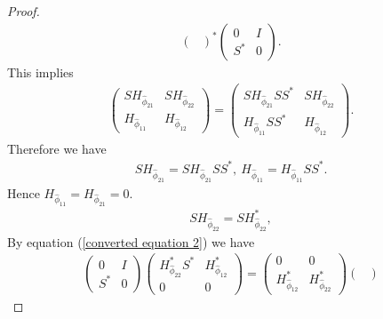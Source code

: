 \documentclass[10pt,a4paper]{amsart}
\begin{document}
\begin{proof}
\begin{align*}
\begin{pmatrix}
                \end{pmatrix}^*
                \begin{pmatrix}
                    0&I\\
                    S^*&0
                \end{pmatrix}.
            \end{align*}
            This implies
            \begin{align*}
               \begin{pmatrix}
                SH_{\hat{\phi}_{21}}&SH_{\hat{\phi}_{22}}\\
                H_{\hat{\phi}_{11}}&H_{\hat{\phi}_{12}}
                \end{pmatrix}=
                \begin{pmatrix}
                SH_{\hat{\phi}_{21}}SS^*&SH_{\hat{\phi}_{22}}\\
                H_{\hat{\phi}_{11}}SS^*&H_{\hat{\phi}_{12}}
            \end{pmatrix}.
            \end{align*}
            Therefore we have
            \begin{align}\label{E1}
                SH_{\hat{\phi}_{21}}=SH_{\hat{\phi}_{21}}SS^*, ~H_{\hat{\phi}_{11}}=H_{\hat{\phi}_{11}}SS^*.
            \end{align}
            Hence $H_{\hat{\phi}_{11}}=H_{\hat{\phi}_{21}}=0.$
            \begin{align}\label{E2}
                SH_{\hat{\phi}_{22}}=SH^*_{\hat{\phi}_{22}},
            \end{align}
            By equation (\ref{converted equation 2}) we have
            \begin{align*}
                \begin{pmatrix}
                    0&I\\
                    S^*&0
                \end{pmatrix}
                \begin{pmatrix}
                H^*_{\hat{\phi}_{22}}S^*&H^*_{\hat{\phi}_{12}}\\
                0&0
                \end{pmatrix}
                =\begin{pmatrix}
                0&0\\
                 H^*_{\hat{\phi}_{12}} &H^*_{\hat{\phi}_{22}}
                \end{pmatrix}
                \begin{pmatrix}

\end{pmatrix}
\end{align*}
\end{proof}
\end{document}
